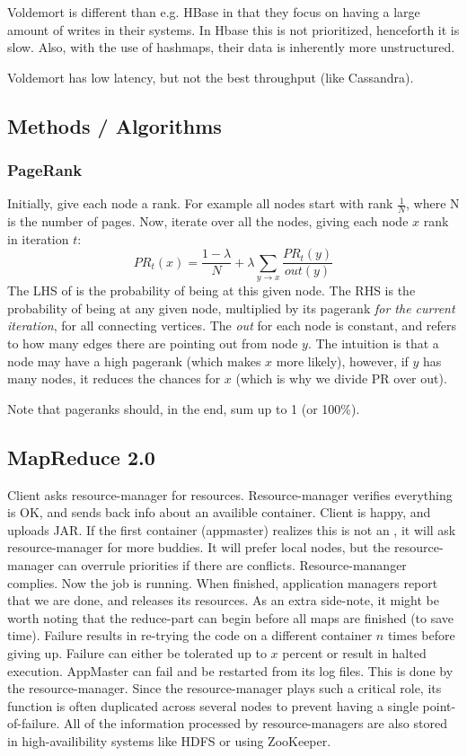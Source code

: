 Voldemort is different than e.g. HBase in that they focus on having a large
amount of writes in their systems.  In Hbase this is not prioritized,
henceforth it is slow. Also, with the use of hashmaps, their data is inherently
more unstructured.

Voldemort has low latency, but not the best throughput (like Cassandra).

\subsection{Methods / Algorithms}
\subsubsection{PageRank}
Initially, give each node a rank. For example all nodes start with rank $\frac{1}{N}$, where N is the number of pages.
Now, iterate over all the nodes, giving each node $x$ rank in iteration $t$:
\begin{equation}\label{eq:pagerank}
    PR_{t}(x) = \frac{1 - \lambda}{N} + \lambda\sum\limits_{{y \rightarrow x}{}}{\frac{PR_{t}(y)}{out(y)}}
\end{equation}
The LHS of  is the probability of being at this given node. The RHS is the probability of being at any given node, multiplied by its pagerank \textit{for the current iteration}, for all connecting vertices. The \textit{out} for each node is constant, and refers to how many edges there are pointing out from node $y$. The intuition is that a node may have a high pagerank (which makes $x$ more likely), however, if $y$ has many nodes, it reduces the chances for $x$ (which is why we divide PR over out).

Note that pageranks should, in the end, sum up to 1 (or 100\%). 


\subsection{MapReduce 2.0}
Client asks resource-manager for resources.
Resource-manager verifies everything is OK, and sends back info about an availible container. Client is happy, and uploads JAR.
If the first container (appmaster) realizes this is not an , it will ask resource-manager for more buddies. It will prefer local nodes, but the resource-manager can overrule priorities if there are conflicts. Resource-mananger complies.
Now the job is running. When finished, application managers report that we are done, 
and releases its resources. As an extra side-note, it might be worth noting that the
reduce-part can begin before all maps are finished (to save time).
Failure results in re-trying the code on a different container $n$ times before giving up. Failure can either be tolerated up to $x$ percent or result in halted execution.
AppMaster can fail and be restarted from its log files. This is done by the resource-manager. Since the resource-manager plays such a critical role, its function
is often duplicated across several nodes to prevent having a single point-of-failure.
All of the information processed by resource-managers are also stored in high-availibility systems like HDFS or using ZooKeeper.

